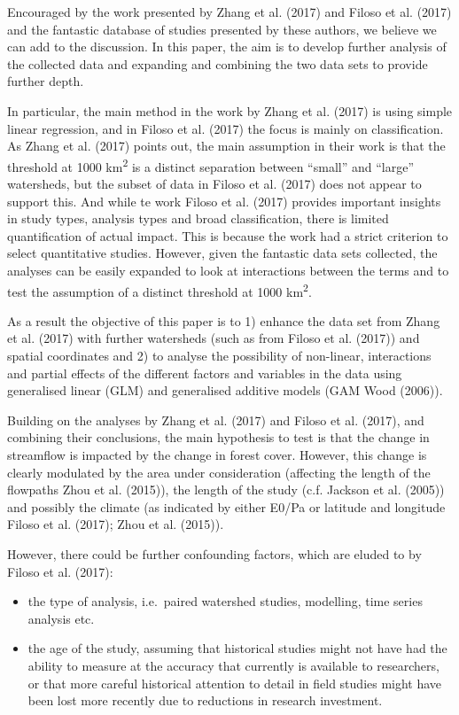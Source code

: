 \documentclass[]{elsarticle} %
\begin{document}
Encouraged by the work presented by Zhang et al. (2017) and Filoso et
al. (2017) and the fantastic database of studies presented by these
authors, we believe we can add to the discussion. In this paper, the aim
is to develop further analysis of the collected data and expanding and
combining the two data sets to provide further depth.

In particular, the main method in the work by Zhang et al. (2017) is
using simple linear regression, and in Filoso et al. (2017) the focus is
mainly on classification. As Zhang et al. (2017) points out, the main
assumption in their work is that the threshold at 1000
km\textsuperscript{2} is a distinct separation between ``small'' and
``large'' watersheds, but the subset of data in Filoso et al. (2017)
does not appear to support this. And while te work Filoso et al. (2017)
provides important insights in study types, analysis types and broad
classification, there is limited quantification of actual impact. This
is because the work had a strict criterion to select quantitative
studies. However, given the fantastic data sets collected, the analyses
can be easily expanded to look at interactions between the terms and to
test the assumption of a distinct threshold at 1000
km\textsuperscript{2}.

As a result the objective of this paper is to 1) enhance the data set
from Zhang et al. (2017) with further watersheds (such as from Filoso et
al. (2017)) and spatial coordinates and 2) to analyse the possibility of
non-linear, interactions and partial effects of the different factors
and variables in the data using generalised linear (GLM) and generalised
additive models (GAM Wood (2006)).

Building on the analyses by Zhang et al. (2017) and Filoso et al.
(2017), and combining their conclusions, the main hypothesis to test is
that the change in streamflow is impacted by the change in forest cover.
However, this change is clearly modulated by the area under
consideration (affecting the length of the flowpaths Zhou et al.
(2015)), the length of the study (c.f. Jackson et al. (2005)) and
possibly the climate (as indicated by either E0/Pa or latitude and
longitude Filoso et al. (2017); Zhou et al. (2015)).

However, there could be further confounding factors, which are eluded to
by Filoso et al. (2017):

\begin{itemize}
\item
  the type of analysis, i.e.~paired watershed studies, modelling, time
  series analysis etc.
\item
  the age of the study, assuming that historical studies might not have
  had the ability to measure at the accuracy that currently is available
  to researchers, or that more careful historical attention to detail in
  field studies might have been lost more recently due to reductions in
  research investment.
\end{itemize}
\end{document}

